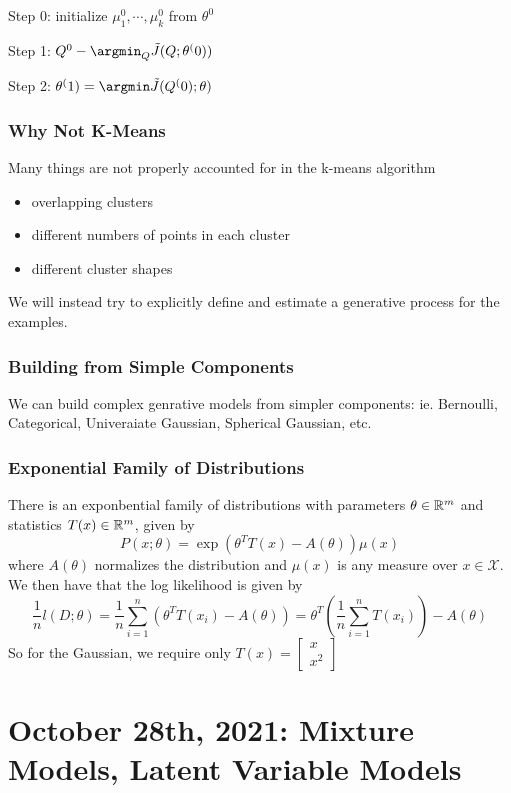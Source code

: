 \documentclass[11pt]{scrartcl}
\begin{document}
Step 0: initialize $\mu_1^{0},\cdots,\mu_k^{0}$ from $\theta^0$

Step 1: $Q^{0}-\argmin_{Q}\tilde{J}(Q;\theta^(0))$

Step 2: $\theta^(1) = \argmin \tilde{J}(Q^(0);\theta)$

\subsubsection{Why Not K-Means}
Many things are not properly accounted for in the k-means algorithm 
\begin{itemize}
\item overlapping clusters
\item different numbers of points in each cluster
\item different cluster shapes
\end{itemize}
We will instead try to explicitly define and estimate a generative process for the examples. 

\subsubsection{Building from Simple Components}
We can build complex genrative models from simpler components: ie. Bernoulli, Categorical, Univeraiate Gaussian, Spherical Gaussian, etc.

\subsubsection{Exponential Family of Distributions}
There is an exponbential family of distributions with parameters $\theta \in \mathbb{R}^m$ and statistics $T(x) \in \mathbb{R}^m$, given by $$P(x;\theta)=\exp(\theta^{T}T(x)-A(\theta))\mu(x)$$ where $A(\theta)$ normalizes the distribution and $\mu(x)$ is any measure over $x \in \mathcal{X}$. We then have that the log likelihood is given by $$\frac{1}{n}l(D;\theta)=\frac{1}{n}\sum_{i=1}^{n}(\theta^{T}T(x_i)-A(\theta))=\theta^{T}\left(\frac{1}{n}\sum_{i=1}^{n}T(x_i)\right)-A(\theta)$$
So for the Gaussian, we require only $T(x)=\begin{bmatrix} x \\ x^2 \end{bmatrix}$

\newpage

\section{October 28th, 2021: Mixture Models, Latent Variable Models}
\end{document}
